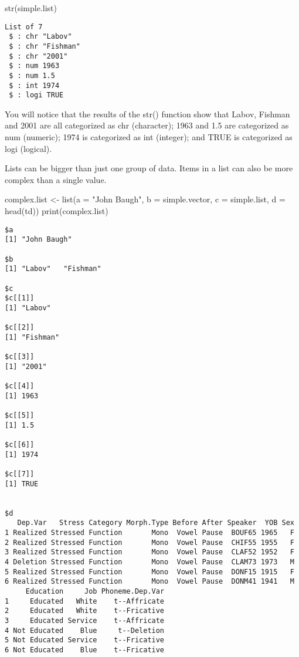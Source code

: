 \documentclass[
  10pt,
  letterpaper]{article}
\newenvironment{Shaded}{\begin{snugshade}}{\end{snugshade}}
\newcommand{\AttributeTok}[1]{\textcolor[rgb]{0.40,0.45,0.13}{#1}}
\newcommand{\FunctionTok}[1]{\textcolor[rgb]{0.28,0.35,0.67}{#1}}
\newcommand{\NormalTok}[1]{\textcolor[rgb]{0.00,0.23,0.31}{#1}}
\newcommand{\OtherTok}[1]{\textcolor[rgb]{0.00,0.23,0.31}{#1}}
\newcommand{\StringTok}[1]{\textcolor[rgb]{0.13,0.47,0.30}{#1}}
\renewcommand\texttt[1]{{\ttfamily\color{BrickRed}#1}}
\begin{document}
\begin{Shaded}
\begin{Highlighting}[]
\FunctionTok{str}\NormalTok{(simple.list)}
\end{Highlighting}
\end{Shaded}

\begin{verbatim}
List of 7
 $ : chr "Labov"
 $ : chr "Fishman"
 $ : chr "2001"
 $ : num 1963
 $ : num 1.5
 $ : int 1974
 $ : logi TRUE
\end{verbatim}

You will notice that the results of the \texttt{str()} function show
that \texttt{Labov}, \texttt{Fishman} and \texttt{2001} are all
categorized as \texttt{chr} (character); \texttt{1963} and \texttt{1.5}
are categorized as \texttt{num} (numeric); \texttt{1974} is categorized
as \texttt{int} (integer); and \texttt{TRUE} is categorized as
\texttt{logi} (logical).

Lists can be bigger than just one group of data. Items in a list can
also be more complex than a single value.

\begin{Shaded}
\begin{Highlighting}[]
\NormalTok{complex.list }\OtherTok{\textless{}{-}} \FunctionTok{list}\NormalTok{(}\AttributeTok{a =} \StringTok{"John Baugh"}\NormalTok{, }\AttributeTok{b =}\NormalTok{ simple.vector,}
    \AttributeTok{c =}\NormalTok{ simple.list, }\AttributeTok{d =} \FunctionTok{head}\NormalTok{(td))}
\FunctionTok{print}\NormalTok{(complex.list)}
\end{Highlighting}
\end{Shaded}

\begin{verbatim}
$a
[1] "John Baugh"

$b
[1] "Labov"   "Fishman"

$c
$c[[1]]
[1] "Labov"

$c[[2]]
[1] "Fishman"

$c[[3]]
[1] "2001"

$c[[4]]
[1] 1963

$c[[5]]
[1] 1.5

$c[[6]]
[1] 1974

$c[[7]]
[1] TRUE


$d
   Dep.Var   Stress Category Morph.Type Before After Speaker  YOB Sex
1 Realized Stressed Function       Mono  Vowel Pause  BOUF65 1965   F
2 Realized Stressed Function       Mono  Vowel Pause  CHIF55 1955   F
3 Realized Stressed Function       Mono  Vowel Pause  CLAF52 1952   F
4 Deletion Stressed Function       Mono  Vowel Pause  CLAM73 1973   M
5 Realized Stressed Function       Mono  Vowel Pause  DONF15 1915   F
6 Realized Stressed Function       Mono  Vowel Pause  DONM41 1941   M
     Education     Job Phoneme.Dep.Var
1     Educated   White    t--Affricate
2     Educated   White    t--Fricative
3     Educated Service    t--Affricate
4 Not Educated    Blue     t--Deletion
5 Not Educated Service    t--Fricative
6 Not Educated    Blue    t--Fricative
\end{verbatim}
\end{document}
